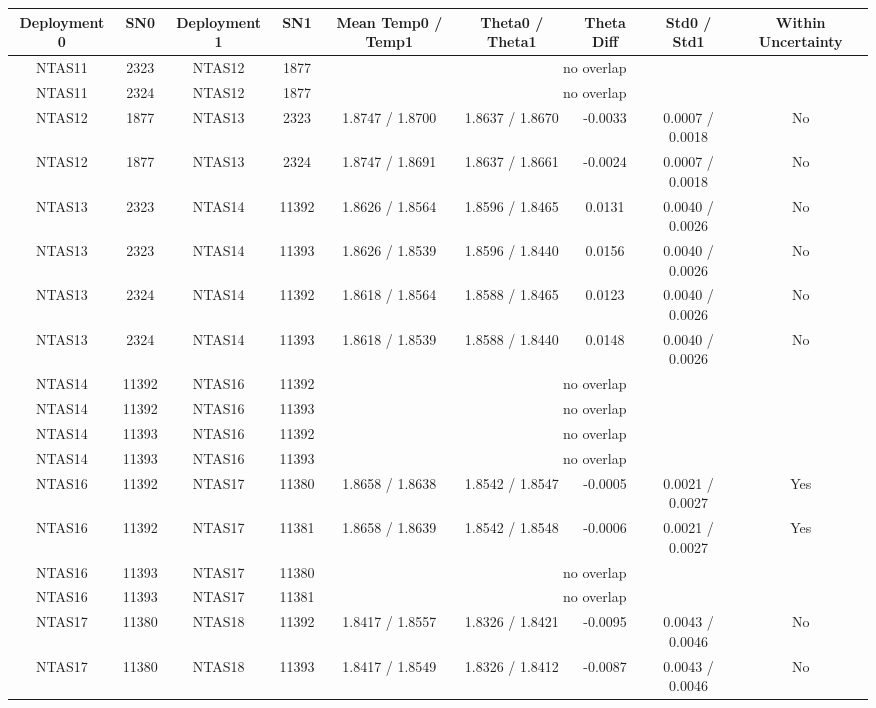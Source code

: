 \begin{table}[h]
\centering
\begin{tabular}{|c|c|c|c|c|c|c|c|c|}
\hline
Deployment 0 & SN0 & Deployment 1 & SN1 & Mean Temp0 / Temp1 & Theta0 / Theta1 & Theta Diff & Std0 / Std1 & Within Uncertainty \\
\hline
NTAS11 & 2323 & NTAS12 & 1877 & \multicolumn{5}{c|}{no overlap} \\
NTAS11 & 2324 & NTAS12 & 1877 & \multicolumn{5}{c|}{no overlap} \\
NTAS12 & 1877 & NTAS13 & 2323 & 1.8747 / 1.8700 & 1.8637 / 1.8670 & -0.0033 & 0.0007 / 0.0018 & No \\
NTAS12 & 1877 & NTAS13 & 2324 & 1.8747 / 1.8691 & 1.8637 / 1.8661 & -0.0024 & 0.0007 / 0.0018 & No \\
NTAS13 & 2323 & NTAS14 & 11392 & 1.8626 / 1.8564 & 1.8596 / 1.8465 & 0.0131 & 0.0040 / 0.0026 & No \\
NTAS13 & 2323 & NTAS14 & 11393 & 1.8626 / 1.8539 & 1.8596 / 1.8440 & 0.0156 & 0.0040 / 0.0026 & No \\
NTAS13 & 2324 & NTAS14 & 11392 & 1.8618 / 1.8564 & 1.8588 / 1.8465 & 0.0123 & 0.0040 / 0.0026 & No \\
NTAS13 & 2324 & NTAS14 & 11393 & 1.8618 / 1.8539 & 1.8588 / 1.8440 & 0.0148 & 0.0040 / 0.0026 & No \\
NTAS14 & 11392 & NTAS16 & 11392 & \multicolumn{5}{c|}{no overlap} \\
NTAS14 & 11392 & NTAS16 & 11393 & \multicolumn{5}{c|}{no overlap} \\
NTAS14 & 11393 & NTAS16 & 11392 & \multicolumn{5}{c|}{no overlap} \\
NTAS14 & 11393 & NTAS16 & 11393 & \multicolumn{5}{c|}{no overlap} \\
NTAS16 & 11392 & NTAS17 & 11380 & 1.8658 / 1.8638 & 1.8542 / 1.8547 & -0.0005 & 0.0021 / 0.0027 & Yes \\
NTAS16 & 11392 & NTAS17 & 11381 & 1.8658 / 1.8639 & 1.8542 / 1.8548 & -0.0006 & 0.0021 / 0.0027 & Yes \\
NTAS16 & 11393 & NTAS17 & 11380 & \multicolumn{5}{c|}{no overlap} \\
NTAS16 & 11393 & NTAS17 & 11381 & \multicolumn{5}{c|}{no overlap} \\
NTAS17 & 11380 & NTAS18 & 11392 & 1.8417 / 1.8557 & 1.8326 / 1.8421 & -0.0095 & 0.0043 / 0.0046 & No \\
NTAS17 & 11380 & NTAS18 & 11393 & 1.8417 / 1.8549 & 1.8326 / 1.8412 & -0.0087 & 0.0043 / 0.0046 & No \\

\end{tabular}
\end{table}
